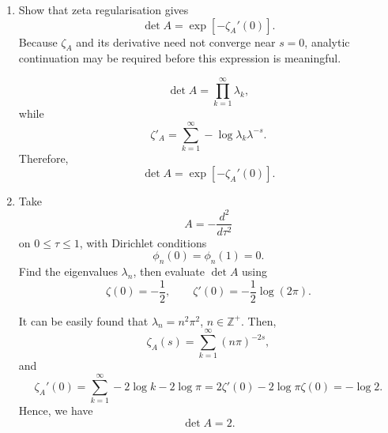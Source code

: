 \begin{enumerate}[label=\alph*)]
    \item Show that zeta regularisation gives
    \begin{equation}
        \det A=\exp\!\left[-\zeta_A'(0)\right].
    \end{equation}
    Because $\zeta_A$ and its derivative need not converge near $s=0$,
    analytic continuation may be required before this expression is meaningful.
    \begin{solution}
        \begin{equation}
            \det A =\prod_{k=1}^\infty \lambda_k,
        \end{equation}
        while
        \begin{equation}
            \zeta'_A = \sum_{k=1}^\infty-\log \lambda_k \lambda^{-s}.
        \end{equation}
        Therefore,
        \begin{equation}
            \det A=\exp\!\left[-\zeta_A'(0)\right].
        \end{equation}
    \end{solution}

    \item Take
    \begin{equation}
        A=-\frac{d^2}{d\tau^2}
    \end{equation}
    on $0\leq\tau\leq1$, with Dirichlet conditions
    \begin{equation}
        \phi_n(0)=\phi_n(1)=0.
    \end{equation}
    Find the eigenvalues $\lambda_n$, then evaluate $\det A$ using
    \begin{equation}
        \zeta(0)=-\frac{1}{2},
        \qquad
        \zeta'(0)=-\frac{1}{2}\log(2\pi).
    \end{equation}
    \begin{solution}
        It can be easily found that $\lambda_n = n^2\pi^2$, $n \in \mathbb{Z}^{+}$. Then,
        \begin{equation}
            \zeta_A (s) = \sum_{k=1}^\infty(n\pi)^{-2s},
        \end{equation}
        and
        \begin{equation}
            \zeta_A'(0) = \sum_{k=1}^\infty-2\log k - 2\log\pi = 2\zeta'(0) -2\log \pi\zeta(0) = -\log2.
        \end{equation}
        Hence, we have
        \begin{equation}
            \det A = 2.
        \end{equation}
    \end{solution}


\end{enumerate}

